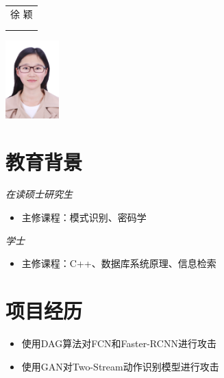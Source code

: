 \documentclass{resume}
\begin{document}

\medskip\noindent
\begin{minipage}{0.7\textwidth}
  \Large{
    \begin{tabu}  { l }
      \scshape{徐 \quad  颖} \\
       \\
       \\
    \end{tabu}
  }
\end{minipage}
\begin{minipage}{0.3\textwidth}
  \raggedleft
  \includegraphics[height=30mm]{xy}
\end{minipage}

\section{  教育背景}
\textit{在读硕士研究生}
\begin{itemize}[topsep = 0 pt, partopsep = 0pt]
  \item  主修课程：模式识别、密码学
\end{itemize}
\textit{学士}
\begin{itemize}[topsep = 0 pt, partopsep = 0pt]
  \item 主修课程：C++、数据库系统原理、信息检索
\end{itemize}

\section{  项目经历}

\begin{itemize}[topsep = 0 pt, partopsep = 0pt]
  \item 使用DAG算法对FCN和Faster-RCNN进行攻击
  \item 使用GAN对Two-Stream动作识别模型进行攻击
\end{itemize}
\end{document}
